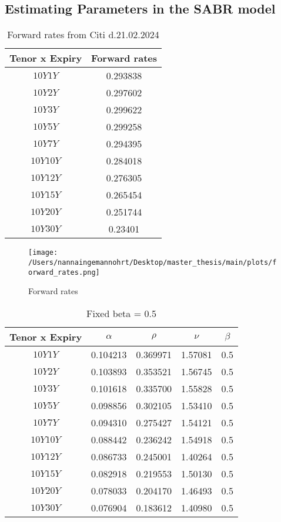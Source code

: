 \subsection{Estimating Parameters in the SABR model}

\begin{table}[H]
    \centering
    \begin{tabular}{cc}
      \toprule
      \textbf{Tenor x Expiry } & \textbf{Forward rates} \\
      \midrule
      $10Y1Y$ &0.293838 \\
      $10Y2Y$ & 0.297602\\
      $10Y3Y$ & 0.299622\\
      $10Y5Y$ & 0.299258\\
      $10Y7Y$ & 0.294395\\
      $10Y10Y$ & 0.284018\\
      $10Y12Y$ & 0.276305\\
      $10Y15Y$ & 0.265454\\
      $10Y20Y$ & 0.251744\\
      $10Y30Y$ & 0.23401\\
      \bottomrule
    \end{tabular}
    \caption{Forward rates from Citi d.21.02.2024}
    \label{tab:farward_parm}
\end{table}
\noindent

\begin{figure}[H]
    \centering
    \texttt{[image: /Users/nannaingemannohrt/Desktop/master\_thesis/main/plots/forward\_rates.png]}
    \caption{Forward rates}
    \label{fig:forward_plot}
\end{figure}

\begin{table}[H]
    \centering
    \begin{tabular}{ccccc}
      \toprule
      \textbf{Tenor x Expiry } & \textbf{$\alpha$} & \textbf{$\rho$}  & \textbf{$\nu$} & \textbf{$\beta$}\\
      \midrule
      $10Y1Y$ &0.104213 & 0.369971 & 1.57081 & 0.5\\
      $10Y2Y$ &0.103893 & 0.353521 & 1.56745 & 0.5 \\
      $10Y3Y$ &0.101618 & 0.335700 & 1.55828 &0.5 \\
      $10Y5Y$ &0.098856 & 0.302105 & 1.53410& 0.5 \\
      $10Y7Y$ & 0.094310 & 0.275427 &1.54121&0.5\\
      $10Y10Y$ & 0.088442 & 0.236242 & 1.54918 &0.5\\
      $10Y12Y$ &0.086733 & 0.245001 & 1.40264 & 0.5 \\
      $10Y15Y$ & 0.082918 & 0.219553 & 1.50130 & 0.5\\
      $10Y20Y$ &0.078033 & 0.204170 & 1.46493 &0.5 \\
      $10Y30Y$ &0.076904 & 0.183612 & 1.40980 & 0.5 \\
      \bottomrule
    \end{tabular}
    \caption{Fixed beta = 0.5}
    \label{tab:beta_0.5}
\end{table}
\noindent

